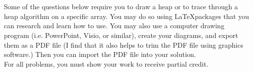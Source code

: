 \documentclass[addpoints,11pt]{exam}
\begin{document}
\pagestyle{empty}


\\
\\

%
%
%
\renewcommand{\solutiontitle}{\noindent\textbf{Answer:}\par\noindent}
\printanswers


Some of the questions below require you to draw a heap or to trace through a heap algorithm on a specific array.  You may do so using \LaTeX packages that you can research and learn how to use.  You may also use a computer drawing program (i.e. PowerPoint, Visio, or similar), create your diagrams, and export them as a PDF file (I find that it also helps to trim the PDF file using graphics software.)  Then you can import the PDF file into your solution.\\

For all problems, you must show your work to receive partial credit.
\end{document}
